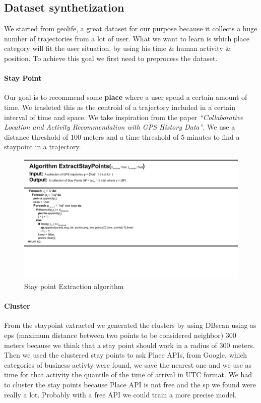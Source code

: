 \documentclass[../../main]{subfiles}
\begin{document}

\label{ss:dataset-synthetization}
\subsection{Dataset synthetization}
We started from geolife, a great dataset for our purpose because it collects a huge number of trajectories from a lot of user. What we want to learn is which place category will fit the user situation, by using his time \& human activity \& position.
To achieve this goal we first need to preprocess the dataset.

\paragraph{Stay Point}
Our goal is to recommend some \textbf{place} where a user spend a certain amount of time. We trasleted this as the centroid
of a trajectory included in a certain interval of time and space. We take inspiration from the paper 
\textit{``Collaborative Location and Activity Recommendation with GPS History Data''}. 
We use a distance threshold of 100 meters and a time threshold of 5 minutes to find a staypoint in a trajectory.
\begin{figure}[h]
    \centering
    \includegraphics{images/sp.png}
    \caption{Stay point Extraction algorithm}\label{fig:extraction_sp}
\end{figure}

\paragraph{Cluster}
From the staypoint extracted we generated the clusters by using DBscan using as eps (maximum distance between two points to be considered neighbor) 
300 meters because we think that a stay point should work in a radius of 300 meters. Then we used the clustered stay points to ask Place APIs, from Google, 
which categories of business activty were found, we save the nearest one and we use as time for that activity the quantile of the time of arrival in UTC format.
We had to cluster the stay points because Place API is not free and the sp we found were really a lot. Probably with a free API we could train a more precise model.
\end{document}
